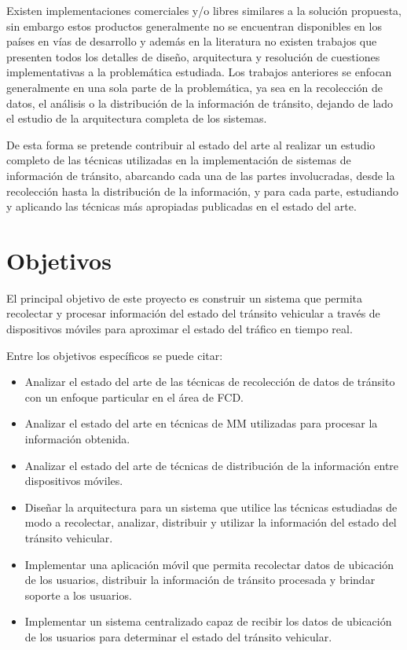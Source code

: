 Existen implementaciones comerciales y/o libres similares a la solución propuesta, sin embargo estos productos generalmente no se encuentran disponibles en los países en vías de desarrollo y además en la literatura no existen trabajos que presenten todos los detalles de diseño, arquitectura y resolución de cuestiones implementativas a la problemática estudiada. Los trabajos anteriores se enfocan generalmente en una sola parte de la problemática, ya sea en la recolección de datos, el análisis o la distribución de la información de tránsito, dejando de lado el estudio de la arquitectura completa de los sistemas.

De esta forma se pretende contribuir al estado del arte al realizar un estudio completo de las técnicas utilizadas en la implementación de sistemas de información de tránsito, abarcando cada una de las partes involucradas, desde la recolección hasta la distribución de la información, y para cada parte, estudiando y aplicando las técnicas más apropiadas publicadas en el estado del arte.

\section{Objetivos}

El principal objetivo de este proyecto es construir un sistema que permita recolectar y procesar información del estado del tránsito vehicular a través de dispositivos móviles para aproximar el estado del tráfico en tiempo real.

Entre los objetivos específicos se puede citar:

\begin{itemize}

\item Analizar el estado del arte de las técnicas de recolección de datos de tránsito con un enfoque particular en el área de FCD.

\item Analizar el estado del arte en técnicas de MM utilizadas para procesar la información obtenida.

\item Analizar el estado del arte de técnicas de distribución de la información entre dispositivos móviles.

\item Diseñar la arquitectura para un sistema que utilice las técnicas estudiadas de modo a recolectar, analizar, distribuir y utilizar la información del estado del tránsito vehicular.

\item Implementar una aplicación móvil que permita recolectar datos de ubicación de los usuarios, distribuir la información de tránsito procesada y brindar soporte a los usuarios.

\item Implementar un sistema centralizado capaz de recibir los datos de ubicación de los usuarios para determinar el estado del tránsito vehicular.

\end{itemize}

